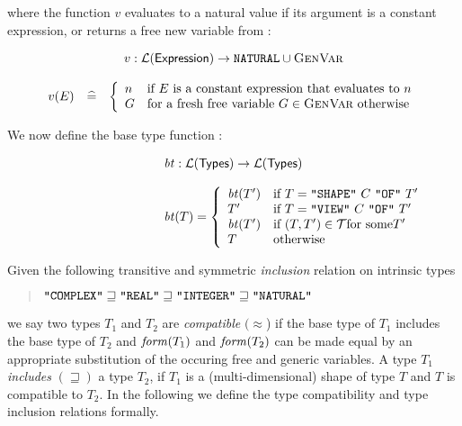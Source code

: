 \noindent where the function $v$ evaluates to a natural value if its
argument is a constant expression, or returns a free new variable from
\genvar:

\[
\begin{array}{rcl}
\multicolumn{3}{c}{
v: \Language{\NT{Expression}} \rightarrow \mbox{\tt NATURAL} \cup
\genvar}\\
\hlf
v(E) & \widehat{=} & \left\{
\begin{array}{ll}
n 
  & \mbox{if $E$ is a constant expression that evaluates to } n\\
G
  & \mbox{for a fresh free variable $G \in \genvar$ otherwise}
\end{array}
\right.
\end{array}
\]

\noindent We now define the base type function \bt:

\[
\begin{array}{rcl}
\multicolumn{3}{c}{
\bt: \Language{\NT{Types}} \rightarrow \Language{\NT{Types}}}\\
\hlf
\bt(T) = \left\{\begin{array}{ll}
\bt(T') & \mbox{if } T = \T{SHAPE}\ C\ \T{OF}\ T'\\
T'      & \mbox{if } T = \T{VIEW}\ C\ \T{OF}\ T'\\
\bt(T') & \mbox{if } (T,T') \in \TypeDefSet \mathrm{ for\ some } T'\\
T	& \mbox{otherwise}
\end{array}
\right.
\end{array}
\]

\noindent Given the following transitive and symmetric {\em inclusion}
relation on intrinsic types

\begin{quote}
\(
\mbox{\tt "{COMPLEX}"} \sqsupseteq \mbox{\tt "{REAL}"} \sqsupseteq
\mbox{\tt "{INTEGER}"} \sqsupseteq \mbox{\tt "{NATURAL}"}
\)
\end{quote}

\noindent we say two types $T_1$ and $T_2$ are {\em compatible}
$(\approx$) if the base type of $T_1$ includes the base type of $T_2$
and $\mbox{\em form\/}(T_1)$ and $\mbox{\em form\/}(T_2)$ can be made equal by an appropriate
substitution of the occuring free and generic variables. A type $T_1$
{\em includes} $(\sqsupseteq)$ a type $T_2$, if $T_1$ is a
(multi-dimensional) shape of type $T$ and $T$ is compatible to $T_2$. In
the following we define the type compatibility and type inclusion
relations formally.

